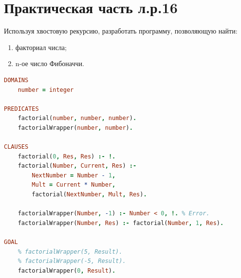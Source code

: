 \documentclass[a4paper,oneside,12pt]{extreport}
\begin{document}


\section*{Практическая часть л.р.16}

\begin{task}
    Используя хвостовую рекурсию, разработать программу, позволяющую найти:

    \begin{enumerate}
        \item факториал числа;
        \item n-ое число Фибоначчи.
    \end{enumerate}

    \begin{lstlisting}[language=Prolog]
DOMAINS 
	number = integer

PREDICATES
	factorial(number, number, number).
	factorialWrapper(number, number).
	
CLAUSES
	factorial(0, Res, Res) :- !.
	factorial(Number, Current, Res) :- 
		NextNumber = Number - 1,
		Mult = Current * Number,
		factorial(NextNumber, Mult, Res).
	
	factorialWrapper(Number, -1) :- Number < 0, !. % Error. 
	factorialWrapper(Number, Res) :- factorial(Number, 1, Res).
	
GOAL
	% factorialWrapper(5, Result).
	% factorialWrapper(-5, Result).	
	factorialWrapper(0, Result).
\end{lstlisting}

    \newpage

    \begin{figure}[ht!]
    \end{figure}


\end{task}
\end{document}
